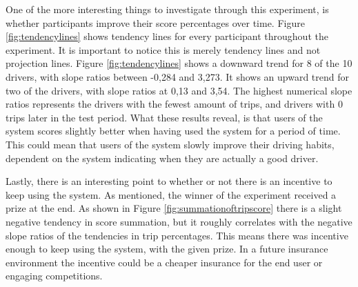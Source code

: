 One of the more interesting things to investigate through this experiment, is whether participants improve their score percentages over time. Figure \ref{fig:tendencylines} shows tendency lines for every participant throughout the experiment. It is important to notice this is merely tendency lines and not projection lines. Figure \ref{fig:tendencylines} shows a downward trend for 8 of the 10 drivers, with slope ratios between -0,284 and 3,273. It shows an upward trend for two of the drivers, with slope ratios at 0,13 and 3,54. The highest numerical slope ratios represents the drivers with the fewest amount of trips, and drivers with 0 trips later in the test period. What these results reveal, is that users of the system scores slightly better when having used the system for a period of time. This could mean that users of the system slowly improve their driving habits, dependent on the system indicating when they are actually a good driver.


Lastly, there is an interesting point to whether or not there is an incentive to keep using the system. As mentioned, the winner of the experiment received a prize at the end. As shown in Figure \ref{fig:summationoftripscore} there is a slight negative tendency in score summation, but it roughly correlates with the negative slope ratios of the tendencies in trip percentages. This means there was incentive enough to keep using the system, with the given prize. In a future insurance environment the incentive could be a cheaper insurance for the end user or engaging competitions.
 